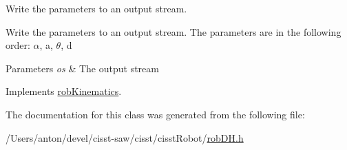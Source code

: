 Write the parameters to an output stream. 

Write the parameters to an output stream. The parameters are in the following order\+: $\alpha$, a, $\theta$, d 
\begin{DoxyParams}{Parameters}
{\em os} & The output stream \\
\hline
\end{DoxyParams}


Implements \hyperlink{classrob_kinematics_afbfe67b8baaed6fdee85bef681f195e1}{rob\+Kinematics}.



The documentation for this class was generated from the following file\+:\begin{DoxyCompactItemize}
\item 
/\+Users/anton/devel/cisst-\/saw/cisst/cisst\+Robot/\hyperlink{rob_d_h_8h}{rob\+D\+H.\+h}\end{DoxyCompactItemize}
